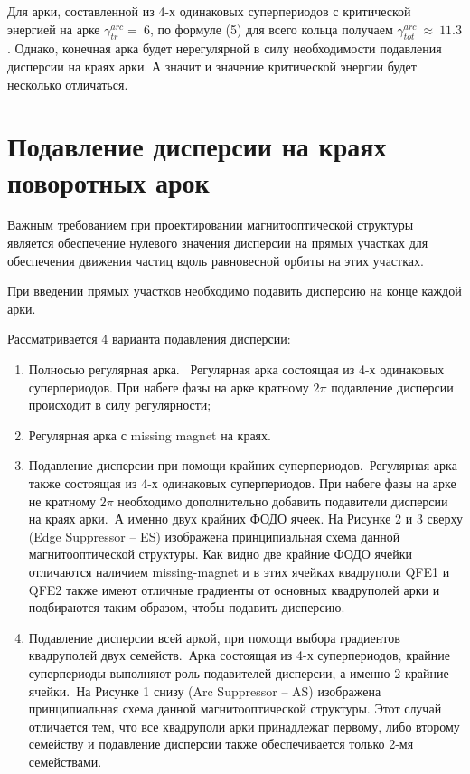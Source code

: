 \par Для арки, составленной из 4-х одинаковых суперпериодов с критической энергией  на арке $\gamma_{tr}^{arc}=\ 6$, по формуле (5) для всего кольца получаем $\gamma_{tot}^{arc}\ \approx\ 11.3$. Однако, конечная арка будет нерегулярной в силу необходимости подавления дисперсии на краях арки. А значит и значение критической энергии будет несколько отличаться.

\section{Подавление дисперсии на краях поворотных арок}\label{sec:transition_variation/disp_supperssion}

\par Важным требованием при проектировании магнитооптической структуры является обеспечение нулевого значения дисперсии на прямых участках для обеспечения движения частиц вдоль равновесной орбиты на этих участках.

При введении прямых участков необходимо подавить дисперсию на конце каждой арки.

Рассматривается 4 варианта подавления дисперсии:

\begin{enumerate} 
\item	Полносью регулярная арка. \ Регулярная арка состоящая из 4-х одинаковых суперпериодов. При набеге фазы на арке кратному $2\pi$ подавление дисперсии происходит в силу регулярности;
\item Регулярная арка с missing magnet на краях.
\item	Подавление дисперсии при помощи крайних суперпериодов.\
Регулярная арка также состоящая из 4-х одинаковых суперпериодов. При набеге фазы на арке не кратному $2\pi$ необходимо дополнительно добавить подавители дисперсии на краях арки.\
А именно двух крайних ФОДО ячеек. На Рисунке 2 и 3 сверху (Edge Suppressor – ES) изображена принципиальная схема данной магнитооптической структуры. Как видно две крайние ФОДО ячейки отличаются наличием missing-magnet и в этих ячейках квадруполи QFE1 и QFE2 также имеют отличные градиенты от основных квадруполей арки и подбираются таким образом, чтобы подавить дисперсию.
\item	Подавление дисперсии всей аркой, при помощи выбора градиентов квадруполей двух семейств.\
Арка состоящая из 4-х суперпериодов, крайние суперпериоды выполняют роль подавителей дисперсии, а именно 2 крайние ячейки.\
На Рисунке 1 снизу (Arc Suppressor – AS) изображена принципиальная схема данной магнитооптической структуры. Этот случай отличается тем, что все квадруполи арки принадлежат первому, либо второму семейству и подавление дисперсии также обеспечивается только 2-мя семействами.
\end{enumerate} 

